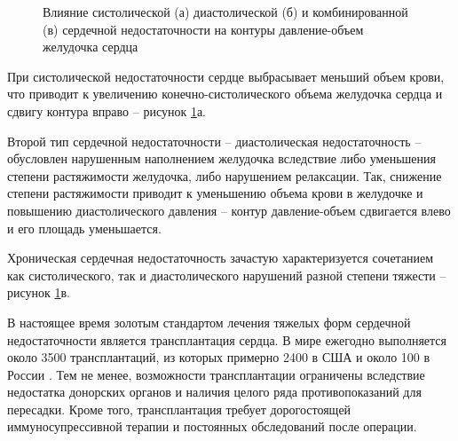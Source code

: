 \begin{figure}[ht]
\begin{minipage}[ht]{0.32\linewidth}
  \end{minipage}
  \caption{Влияние систолической (а) диастолической (б) и комбинированной (в) сердечной недостаточности на контуры давление-объем желудочка сердца}
  \label{img:pv_loops}  
\end{figure}

При систолической недостаточности сердце выбрасывает меньший объем крови, что приводит к увеличению конечно-систолического объема желудочка сердца и сдвигу контура вправо -- рисунок \ref{img:pv_loops}а.

Второй тип сердечной недостаточности -- диастолическая недостаточность -- обусловлен нарушенным наполнением желудочка вследствие либо уменьшения степени растяжимости желудочка, либо нарушением релаксации. Так, снижение степени растяжимости приводит к уменьшению объема крови в желудочке и повышению диастолического давления -- контур давление-объем сдвигается влево и его площадь уменьшается. 

Хроническая сердечная недостаточность зачастую характеризуется сочетанием как систолического, так и диастолического нарушений разной степени тяжести -- рисунок \ref{img:pv_loops}в.

В настоящее время золотым стандартом лечения тяжелых форм сердечной недостаточности является трансплантация сердца. В мире ежегодно выполняется около 3500 трансплантаций, из которых примерно 2400 в США и около 100 в России \cite{frazier2017invited, transpl_ru}. Тем не менее, возможности трансплантации ограничены вследствие недостатка донорских органов и наличия целого ряда противопоказаний для пересадки. Кроме того, трансплантация требует дорогостоящей иммуносупрессивной терапии и постоянных обследований после операции. 

